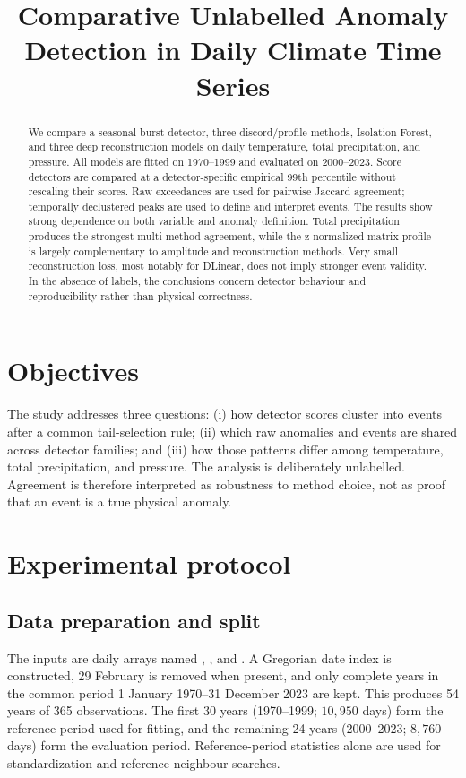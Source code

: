 \documentclass[11pt,a4paper]{article}
\title{Comparative Unlabelled Anomaly Detection in Daily Climate Time Series}
\author{}
\date{}
\begin{document}
\maketitle

\begin{abstract}
We compare a seasonal burst detector, three discord/profile methods, Isolation
Forest, and three deep reconstruction models on daily temperature,
total precipitation, and pressure. All models are fitted on 1970--1999 and evaluated
on 2000--2023. Score detectors are compared at a detector-specific empirical
99th percentile without rescaling their scores. Raw exceedances are used for
pairwise Jaccard agreement; temporally declustered peaks are used to define and
interpret events. The results show strong dependence on both variable and
anomaly definition. Total precipitation produces the strongest multi-method
agreement, while the z-normalized matrix profile is largely complementary to
amplitude and reconstruction methods. Very small reconstruction loss, most
notably for DLinear, does not imply stronger event validity. In the absence of
labels, the conclusions concern detector behaviour and reproducibility rather
than physical correctness.
\end{abstract}

\section{Objectives}
The study addresses three questions: (i) how detector scores cluster into
events after a common tail-selection rule; (ii) which raw anomalies and events
are shared across detector families; and (iii) how those patterns differ among
temperature, total precipitation, and pressure. The analysis is deliberately
unlabelled. Agreement is therefore interpreted as robustness to method choice,
not as proof that an event is a true physical anomaly.

\section{Experimental protocol}

\subsection{Data preparation and split}
The inputs are daily arrays named ,
, and . A Gregorian
date index is constructed, 29 February is removed when present, and only
complete years in the common period 1 January 1970--31 December 2023 are kept.
This produces 54 years of 365 observations. The first 30 years (1970--1999;
$10{,}950$ days) form the reference period used for fitting, and the remaining
24 years (2000--2023; $8{,}760$ days) form the evaluation period.
Reference-period statistics alone are used for standardization and
reference-neighbour searches.
\end{document}
